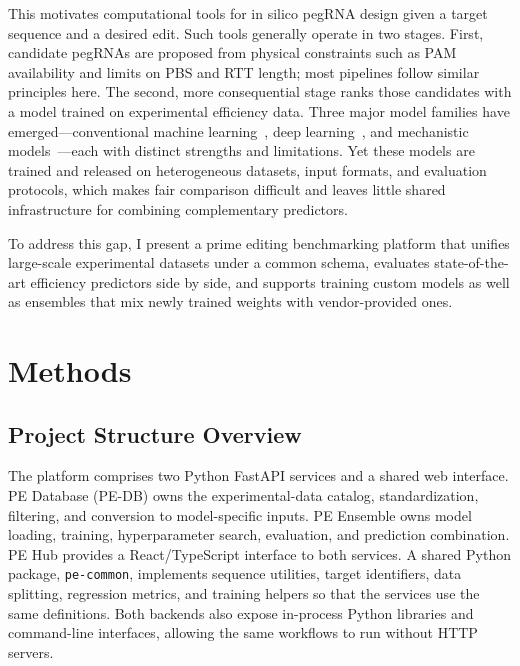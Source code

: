 \documentclass{article}
\begin{document}
This motivates computational tools for in silico pegRNA design given a target sequence and a desired edit.
Such tools generally operate in two stages.
First, candidate pegRNAs are proposed from physical constraints such as PAM availability and limits on PBS and RTT length; most pipelines follow similar principles here.
The second, more consequential stage ranks those candidates with a model trained on experimental efficiency data.
Three major model families have emerged---conventional machine learning~\cite{liEasyPrimeMachineLearning2021,koeppelPredictionPrimeEditing2023}, deep learning~\cite{kimPredictingEfficiencyPrime2021,yuPredictionEfficienciesDiverse2023,schwankgeraldPredictingPrimeEditing2023,mathisMachineLearningPrediction2024}, and mechanistic models~\cite{hsuMechanisticMachineLearning2026}---each with distinct strengths and limitations.
Yet these models are trained and released on heterogeneous datasets, input formats, and evaluation protocols, which makes fair comparison difficult and leaves little shared infrastructure for combining complementary predictors.

To address this gap, I present a prime editing benchmarking platform that unifies large-scale experimental datasets under a common schema, evaluates state-of-the-art efficiency predictors side by side, and supports training custom models as well as ensembles that mix newly trained weights with vendor-provided ones.

\section{Methods}

\subsection{Project Structure Overview}

The platform comprises two Python FastAPI services and a shared web interface. PE Database (PE-DB) owns the experimental-data catalog, standardization, filtering, and conversion to model-specific inputs. PE Ensemble owns model loading, training, hyperparameter search, evaluation, and prediction combination. PE Hub provides a React/TypeScript interface to both services. A shared Python package, \nolinkurl{pe-common}, implements sequence utilities, target identifiers, data splitting, regression metrics, and training helpers so that the services use the same definitions. Both backends also expose in-process Python libraries and command-line interfaces, allowing the same workflows to run without HTTP servers.
\end{document}
